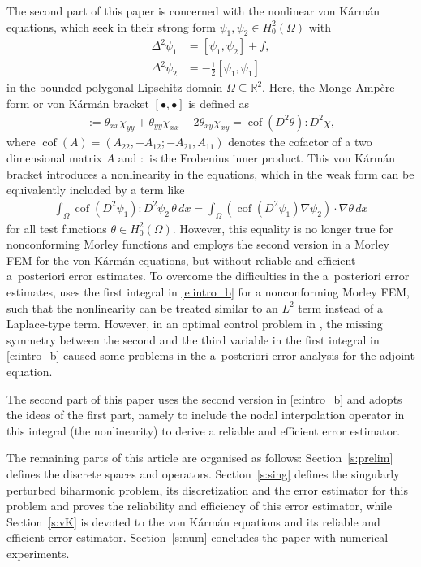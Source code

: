 \documentclass[a4paper]{amsart}
\theoremstyle{definition}
\numberwithin{equation}{section}
\numberwithin{theorem}{section}
\newcommand{\R}{\mathbb{R}}
\newcommand{\cof}{\operatorname{cof}}
\begin{document}
The second part of this paper is concerned with the 
nonlinear von K\'arm\'an equations, which seek in their strong form 
$\psi_1,\psi_2\in H^2_0(\Omega)$ with 
\begin{align*}
    \Delta^2 \psi_1 &= [\psi_1,\psi_2] + f,\\
    \Delta^2 \psi_2 &= -\frac{1}{2}[\psi_1,\psi_1]
\end{align*}
in the bounded polygonal Lipschitz-domain $\Omega\subseteq \R^2$.
Here, the Monge-Amp\`ere form or von K\'arm\'an bracket $[\bullet,\bullet]$
is defined as 
\begin{align*}
    [\theta,\chi] 
    := \theta_{xx}\chi_{yy} + \theta_{yy}\chi_{xx} - 2 \theta_{xy}\chi_{xy}
    = \cof(D^2\theta):D^2\chi, 
\end{align*}
where $\cof(A) = (A_{22}, -A_{12}; -A_{21}, A_{11})$ denotes the 
cofactor of a two dimensional matrix $A$ and $:$ is the Frobenius 
inner product.
This von K\'arm\'an bracket introduces a nonlinearity in the equations,
which in the weak form can be equivalently included by a term like 
\begin{align}\label{e:intro_b}
    \int_\Omega \cof(D^2 \psi_1):D^2\psi_2 \,\theta\,dx
    = \int_\Omega (\cof(D^2 \psi_1)\nabla\psi_2)\cdot \nabla\theta\,dx
\end{align}
for all test functions $\theta\in H^2_0(\Omega)$.
However, this equality is no longer true for nonconforming Morley functions
and \cite{MallikNataraj2016} employs the second version in a 
Morley FEM for the von K\'arm\'an equations, but without reliable and efficient 
a~posteriori error estimates.
To overcome the difficulties in the a~posteriori error estimates,
\cite{CarstensenMallikNataraj2020} uses the first integral in 
\eqref{e:intro_b} for a nonconforming Morley FEM, such that the 
nonlinearity can be treated similar to an $L^2$ term instead 
of a Laplace-type term. However, in an optimal control problem 
in \cite{ChowdhuryDondNatarajShylaja2022}, the missing 
symmetry between the second and the third variable in the first 
integral in \eqref{e:intro_b} caused some problems in the 
a~posteriori error analysis for the adjoint equation.

The second part of this paper uses the second version in \eqref{e:intro_b}
and adopts the ideas of the first part,
namely to include the nodal interpolation operator in this integral
(the nonlinearity) to derive a reliable and efficient error estimator.


\medskip 
The remaining parts of this article are organised as follows:
Section~\ref{s:prelim} defines the discrete spaces and 
operators. Section~\ref{s:sing} defines the singularly perturbed
biharmonic problem, its discretization and the error estimator 
for this problem and proves the reliability and efficiency 
of this error estimator, while Section~\ref{s:vK} 
is devoted to the von K\'arm\'an equations and its reliable 
and efficient error estimator. 
Section~\ref{s:num} concludes the paper with numerical 
experiments.
\end{document}
